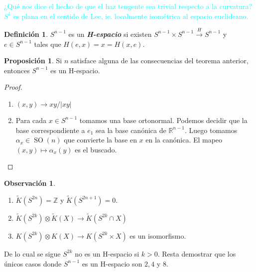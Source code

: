 \documentclass[spanish]{book}
\theoremstyle{definition}
\newtheorem*{defn}{Definición}
\newtheorem*{obs}{Observación}
\newtheorem*{prop}{Proposición}
\newcommand{\R}{\mathbb{R}}
\newcommand{\Z}{\mathbb{Z}}
\begin{document}
\textcolor{cyan}{¿Qué nos dice el hecho de que el haz tengente sea trivial respecto a la curvatura? $S^1$ es plana en el sentido de Lee, ie. localmente isométrica al espacio euclideano.}

\begin{defn}
	$S^{n-1}$ es un \textbf{\textit{H-espacio}} si existen $S^{n-1}\times S^{n-1}\overset{H}{\to} S^{n-1}$ y $e\in S^{n-1}$ tales que $H(e,x)=x=H(x,e)$.
\end{defn}

\begin{prop}
	Si $n$ satisface alguna de las consecuencias del teorema anterior, entonces $S^{n-1}$ es un H-espacio.
\end{prop}
\begin{proof}\leavevmode
	\begin{enumerate}
		\item $(x,y)\to xy/|xy|$
		\item Para cada $x\in S^{n-1}$ tomamos una base ortonormal. Podemos decidir que la base correspondiente a $e_1$ sea la base canónica de $\R^{n-1}$. Luego tomamos $\alpha_x\in\operatorname{SO}(n)$ que convierte la base en $x$ en la canónica. El mapeo $(x,y)\mapsto \alpha_x(y)$ es el buscado.
	\end{enumerate}
\end{proof}
\begin{obs}\leavevmode
	\begin{enumerate}
		\item $\tilde{K}(S^{2n})=\Z$ y $\tilde{K}(S^{2n+1})=0$.
		\item $\tilde{K}(S^{2k})\otimes \tilde{K}(X)\to\tilde{K}(S^{2k}\cap X)$
		\item $K(S^{2k})\otimes K(X)\to K(S^{2k}\times X)$ es un isomorfismo.
	\end{enumerate}
\end{obs}
	De lo cual se sigue $S^{2k}$ no es un H-espacio si $k>0$. Resta demostrar que los únicos casos donde $S^{n-1}$ es un H-espacio son $2,4$ y $8$.
	
\end{document}
